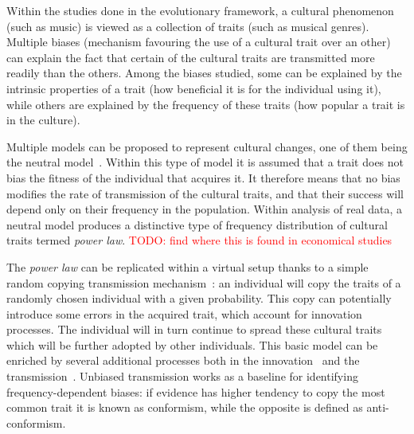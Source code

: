 \documentclass{wscpaperproc}
\newcommand{\memo}[2]{\textcolor{#1}{#2}}
\newcommand{\todo}[1]{\memo{red}{TODO: #1\\}}
\begin{document}
Within the studies done in the evolutionary framework, a cultural phenomenon (such as music) is viewed as a collection of traits (such as musical genres). Multiple biases (mechanism favouring the use of a cultural trait over an other) can explain the fact that certain of the cultural traits are transmitted more readily than the others. Among the biases studied, some can be explained by the intrinsic properties of a trait (how beneficial it is for the individual using it), while others are explained by the frequency of these traits (how popular a trait is in the culture). 

Multiple models can be proposed to represent cultural changes, one of them being the neutral model~\cite{neiman_stylistic_1995}. Within this type of model it is assumed that a trait does not bias the fitness of the individual that acquires it. It therefore means that no bias modifies the rate of transmission of the cultural traits, and that their success will depend only on their frequency in the population. Within analysis of real data, a neutral model produces a distinctive type of frequency distribution of cultural traits termed \emph{power law}. \todo{find where this is found in economical studies}
 
The \emph{power law} can be replicated within a virtual setup thanks to a simple random copying transmission mechanism~\cite{bentley_random_2004}: an individual will copy the traits of a randomly chosen individual with a given probability. This copy can potentially introduce some errors in the acquired trait, which account for innovation processes. The individual will in turn continue to spread these cultural traits which will be further adopted by other individuals. This basic model can be enriched by several additional processes both in the innovation~ and the transmission~\cite{heyes_social_1994,henrich_evolution_2003}. Unbiased transmission works as a baseline for identifying frequency-dependent biases: if evidence has higher tendency to copy the most common trait it is known as conformism, while the opposite is defined as anti-conformism.
\end{document}
